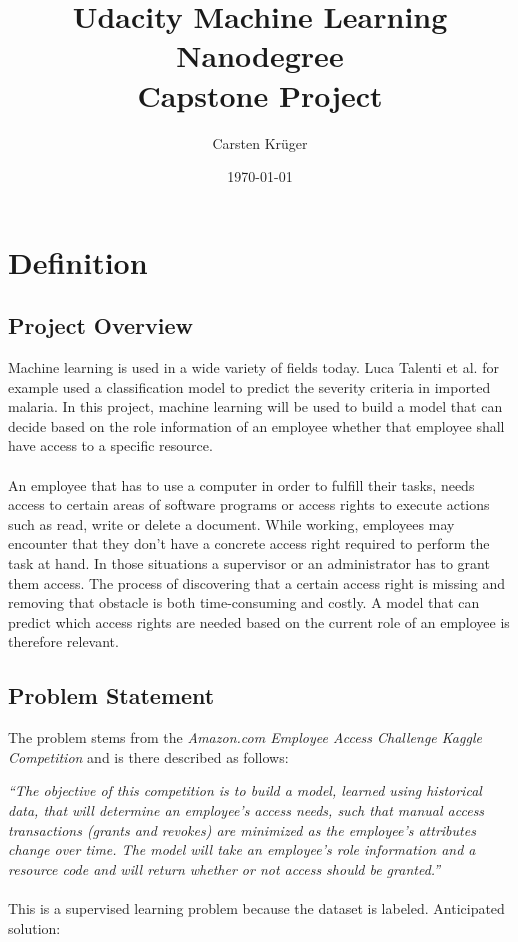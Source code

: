 \documentclass[11pt]{article}
\title{Udacity Machine Learning Nanodegree \\ Capstone Project}
\author{Carsten Kr\"uger}
\date{\today}
\begin{document}
\maketitle

\section{Definition}

\subsection{Project Overview}

Machine learning is used in a wide variety of fields today. 
Luca Talenti et al. \cite{malaria} for example used a classification model to predict 
the severity criteria in imported malaria. In this project, machine learning will be used
to build a model that can decide based on the role information of an employee whether
that employee shall have access to a specific resource. 
\\ \\
An employee that has to use a computer in order to fulfill their tasks, needs access 
to certain areas of software programs or access rights to execute actions such as read, 
write or delete a document. While working, employees may encounter that they don't have a 
concrete access right required to perform the task at hand. In those situations a supervisor or an 
administrator has to grant them access. The process of discovering that a certain access 
right is missing and removing that obstacle is both time-consuming and costly.
A model that can predict which access rights are needed based on the current role of an 
employee is therefore relevant.
    
\subsection{Problem Statement}

The problem stems from the {\it Amazon.com Employee Access Challenge Kaggle Competition} 
\cite{kaggleAmazon} and is there described as follows:

{\it ``The objective of this competition is to build a model, learned using 
historical data, that
 will determine an employee's access needs, such that manual access transactions 
 (grants and revokes) are minimized as the employee's attributes change over time. 
 The model will take an employee's role information and a resource code and will return whether 
 or not access should be granted.''}
\\ \\
This is a supervised learning problem because the dataset is labeled. 
Anticipated solution:
\end{document}
